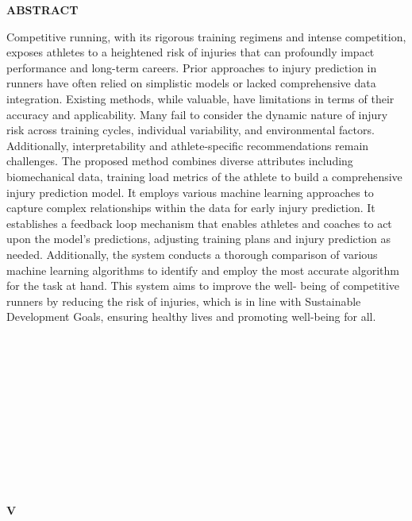 \documentclass[12pt, English]{article}
\begin{document}
\begin{titlepage}

\begin{center}
\textbf{\Large ABSTRACT}\\
\end{center}

\begin{normalsize}
Competitive running, with its rigorous training regimens and intense competition, exposes
athletes to a heightened risk of injuries that can profoundly impact performance and long-term
careers. Prior approaches to injury prediction in runners have often relied on simplistic models
or lacked comprehensive data integration. Existing methods, while valuable, have limitations
in terms of their accuracy and applicability. Many fail to consider the dynamic nature of injury
risk across training cycles, individual variability, and environmental factors. Additionally,
interpretability and athlete-specific recommendations remain challenges. The proposed method
combines diverse attributes including biomechanical data, training load metrics of the athlete
to build a comprehensive injury prediction model. It employs various machine learning
approaches to capture complex relationships within the data for early injury prediction. It
establishes a feedback loop mechanism that enables athletes and coaches to act upon the
model's predictions, adjusting training plans and injury prediction as needed. Additionally, the
system conducts a thorough comparison of various machine learning algorithms to identify and
employ the most accurate algorithm for the task at hand. This system aims to improve the well-
being of competitive runners by reducing the risk of injuries, which is in line with Sustainable
Development Goals, ensuring healthy lives and promoting well-being for all.
\end{normalsize}\\\\\\\\\\\\\\\\\\\\
\begin{normalsize}
\begin{center}
\vspace*{\fill}
\textbf{V}
\end{center}
\end{normalsize}
\end{titlepage}
\end{document}
